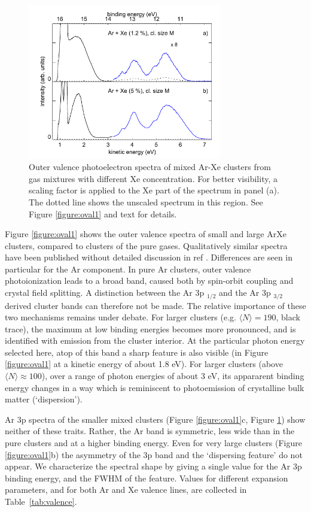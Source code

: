 \documentclass[journal=jpccck,manuscript=article]{achemso}
\begin{document}
\begin{figure}[ht]
 \centering
 \includegraphics[width=8.5cm]{figure_oval_2.pdf}
 \caption{
Outer valence photoelectron spectra of mixed Ar-Xe clusters from gas mixtures with different Xe concentration. 
For better visibility, a scaling factor is applied to the Xe part of the spectrum in panel (a). The dotted line shows the unscaled spectrum in this region.
See Figure \ref{figure:oval1} and text for details.
}
 \label{figure:oval2}
\end{figure}

Figure \ref{figure:oval1} shows the outer valence spectra of small and large ArXe clusters, compared to clusters of the pure gases. 
Qualitatively similar spectra have been published without detailed discussion in ref .
Differences are seen in particular for the Ar component. 
In pure Ar clusters, outer valence photoionization leads to a broad band, caused both by spin-orbit coupling and crystal field splitting. A distinction between the Ar 3p $_{1/2}$ and the Ar 3p $_{3/2}$ derived cluster bands can therefore not be made.
The relative importance of these two mechanisms remains under debate.\cite{hergenhahnprb,rolles,foerstel_arg1_2010}
For larger clusters (e.g. $\langle N\rangle = 190$, black trace), the maximum at low binding energies becomes more pronounced, and is identified with emission from the cluster interior.\cite{hergenhahnprb,rolles}
At the particular photon energy selected here, atop of this band a sharp feature is also visible (in Figure \ref{figure:oval1} at a kinetic energy of about 1.8 eV).
For larger clusters (above $\langle N\rangle \approx 100$), over a range of photon energies of about 3 eV, its appararent binding energy changes in a way which is reminiscent to photoemission of crystalline bulk matter (`dispersion').\cite{foerstel_arg1_2010,foerstel_arg2_2011} 

Ar 3p spectra of the smaller mixed clusters (Figure \ref{figure:oval1}c, Figure \ref{figure:oval2}) show neither of these traits.
Rather, the Ar band is symmetric, less wide than in the pure clusters and at a higher binding energy.
Even for very large clusters (Figure \ref{figure:oval1}b) the asymmetry of the 3p band and the `dispersing feature' do not appear.
We characterize the spectral shape by giving a single value for the Ar 3p binding energy, and the FWHM of the feature.
Values for different expansion parameters, and for both Ar and Xe valence lines, are collected in Table\ \ref{tab:valence}.
\end{document}
